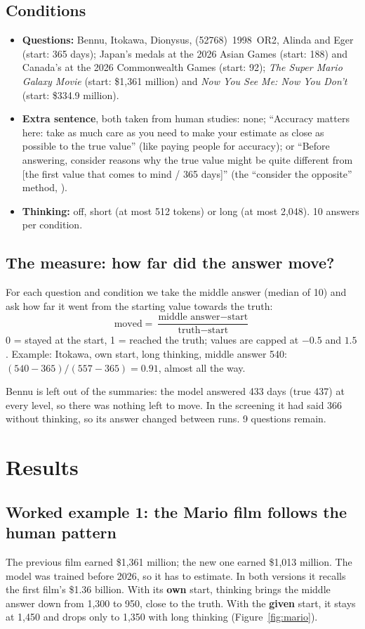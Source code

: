 \documentclass[11pt,a4paper]{article}
\begin{document}
\subsection{Conditions}
\begin{itemize}[leftmargin=*]
  \item \textbf{Questions:} Bennu, Itokawa, Dionysus, (52768)~1998~OR2, Alinda and Eger (start: 365 days); Japan's medals at the 2026 Asian Games (start: 188) and Canada's at the 2026 Commonwealth Games (start: 92); \emph{The Super Mario Galaxy Movie} (start: \$1,361 million) and \emph{Now You See Me: Now You Don't} (start: \$334.9 million).
  \item \textbf{Extra sentence}, both taken from human studies: none; \enquote{Accuracy matters here: take as much care as you need to make your estimate as close as possible to the true value} (like paying people for accuracy); or \enquote{Before answering, consider reasons why the true value might be quite different from [the first value that comes to mind / 365 days]} (the \enquote{consider the opposite} method, \citealp{mussweiler2000overcoming}).
  \item \textbf{Thinking:} off, short (at most 512 tokens) or long (at most 2,048). 10 answers per condition.
\end{itemize}

\subsection{The measure: how far did the answer move?}
For each question and condition we take the middle answer (median of 10) and ask how far it went from the starting value towards the truth:
\[ \text{moved} = \frac{\text{middle answer} - \text{start}}{\text{truth} - \text{start}} \]
0 = stayed at the start, 1 = reached the truth; values are capped at $-0.5$ and $1.5$. Example: Itokawa, own start, long thinking, middle answer 540: $(540-365)/(557-365) = 0.91$, almost all the way.

Bennu is left out of the summaries: the model answered 433 days (true 437) at every level, so there was nothing left to move. In the screening it had said 366 without thinking, so its answer changed between runs. 9 questions remain.

\section{Results}

\subsection{Worked example 1: the Mario film follows the human pattern}
The previous film earned \$1,361 million; the new one earned \$1,013 million. The model was trained before 2026, so it has to estimate. In both versions it recalls the first film's \$1.36 billion. With its \textbf{own} start, thinking brings the middle answer down from 1,300 to 950, close to the truth. With the \textbf{given} start, it stays at 1,450 and drops only to 1,350 with long thinking (Figure~\ref{fig:mario}).
\end{document}
